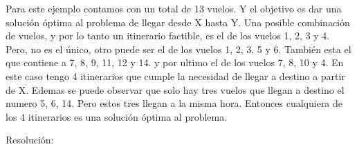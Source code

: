 \documentclass{article}
\begin{document}
Para este ejemplo contamos con un total de 13 vuelos. Y el objetivo es dar una solución óptima al problema de llegar desde X hasta Y. Una posible combinación de vuelos, y por lo tanto un itinerario factible, es el de los vuelos 1, 2, 3 y 4. Pero, no es el único, otro puede ser el de los vuelos 1,  2, 3, 5 y 6. También esta el que contiene a  7, 8, 9, 11, 12 y 14. y por ultimo el de los vuelos 7, 8, 10 y 4. En este caso tengo 4 itinerarios que cumple la necesidad de llegar a destino a partir de X. Edemas se puede observar que solo hay tres vuelos que llegan a destino el numero 5, 6, 14. Pero estos tres llegan a la misma hora. Entonces cualquiera de los 4 itinerarios es una solución óptima al problema.\newline \newline





{\noindent \Huge Resoluci\'on:} \newline \newline
\end{document}
